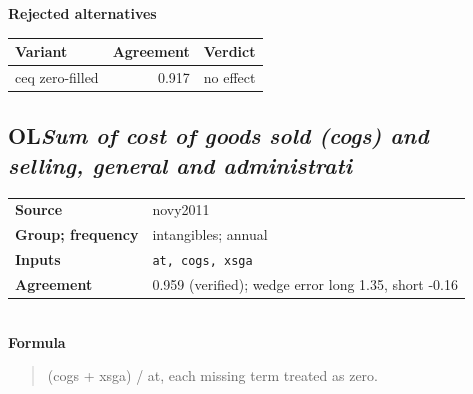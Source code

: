 \documentclass[11pt]{article}
\begin{document}
\textbf{Rejected alternatives}\\[2pt]
{\small\begin{longtable}{@{}p{9.6cm}rp{4.3cm}@{}}
\toprule Variant & Agreement & Verdict\\\midrule\endhead
ceq zero-filled & 0.917 & no effect\\
\bottomrule\end{longtable}}
\subsection*{OL\quad\normalfont\itshape Sum of cost of goods sold (cogs) and selling, general and administrati}
\begin{tabular}{@{}p{3.3cm}p{12.3cm}@{}}
\textbf{Source} & novy2011\\
\textbf{Group; frequency} & intangibles; annual\\
\textbf{Inputs} & \texttt{at, cogs, xsga}\\
\textbf{Agreement} & 0.959 (verified); wedge error long 1.35, short -0.16\\
\end{tabular}\\[4pt]
\textbf{Formula}
\begin{quote}\small
(cogs + xsga) / at, each missing term treated as zero.\\

\end{quote}
\end{document}
